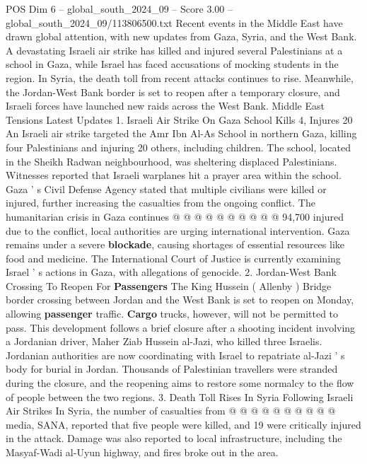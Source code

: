 \begin{textsample}{POS Dim 6 – global\_south\_2024\_09 – Score 3.00 – global\_south\_2024\_09/113806500.txt}  \label{ex:f6_pos_438}
Recent events in the Middle East have drawn global attention, with new updates from Gaza, Syria, and the West Bank.
A devastating Israeli air strike has killed and injured several Palestinians at a school in Gaza, while Israel has faced accusations of mocking students in the region.
In Syria, the death toll from recent attacks continues to rise.
Meanwhile, the Jordan-West Bank border is set to reopen after a temporary closure, and Israeli forces have launched new raids across the West Bank.
Middle East Tensions Latest Updates 1.
Israeli Air Strike On Gaza School Kills 4, Injures 20 An Israeli air strike targeted the Amr Ibn Al-As School in northern Gaza, killing four Palestinians and injuring 20 others, including children.
The school, located in the Sheikh Radwan neighbourhood, was sheltering displaced Palestinians.
Witnesses reported that Israeli warplanes hit a prayer area within the school.
Gaza ' s Civil Defense Agency stated that multiple civilians were killed or injured, further increasing the casualties from the ongoing conflict.
The humanitarian crisis in Gaza continues @ @ @ @ @ @ @ @ @ @ 94,700 injured due to the conflict, local authorities are urging international intervention.
Gaza remains under a severe \textbf{blockade}, causing shortages of essential resources like food and medicine.
The International Court of Justice is currently examining Israel ' s actions in Gaza, with allegations of genocide. 2.
Jordan-West Bank Crossing To Reopen For \textbf{Passengers} The King Hussein ( Allenby ) Bridge border crossing between Jordan and the West Bank is set to reopen on Monday, allowing \textbf{passenger} traffic. \textbf{Cargo} trucks, however, will not be permitted to pass.
This development follows a brief closure after a shooting incident involving a Jordanian driver, Maher Ziab Hussein al-Jazi, who killed three Israelis.
Jordanian authorities are now coordinating with Israel to repatriate al-Jazi ' s body for burial in Jordan.
Thousands of Palestinian travellers were stranded during the closure, and the reopening aims to restore some normalcy to the flow of people between the two regions. 3.
Death Toll Rises In Syria Following Israeli Air Strikes In Syria, the number of casualties from @ @ @ @ @ @ @ @ @ @ media, SANA, reported that five people were killed, and 19 were critically injured in the attack.
Damage was also reported to local infrastructure, including the Masyaf-Wadi al-Uyun highway, and fires broke out in the area.

\end{textsample}
